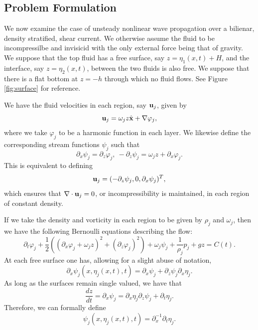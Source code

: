 \documentclass[a4paper,11pt]{article}
\newcommand{\p}{\partial}
\begin{document}
\subsection{Problem Formulation}

We now examine the case of unsteady nonlinear wave propagation over a bilienar, density stratified, shear current.  We otherwise assume the fluid to be incompressilbe and invisicid with the only external force being that of gravity.  We suppose that the top fluid has a free surface, say $z=\eta_{1}(x,t)+H$, and the interface, say $z=\eta_{2}(x,t)$, between the two fluids is also free.  We suppose that there is a flat bottom at $z=-h$ through which no fluid flows.  See Figure \ref{fig:surface} for reference. 

We have the fluid velocities in each region, say ${\bf u}_{j}$, given by 
\[
{\bf u}_{j} = \omega_{j}z\hat{{\bf x}} + \nabla \varphi_{j}, 
\]
where we take $\varphi_{j}$ to be a harmonic function in each layer.  We likewise define the corresponding stream functions $\psi_{j}$ such that 
\[
\p_{x}\psi_{j} = \p_{z}\varphi_{j}, ~ -\p_{z}\psi_{j} = \omega_{j}z + \p_{x}\varphi_{j}.
\]
This is equivalent to defining 
\[
{\bf u}_{j} = (-\p_{z}\psi_{j},0,\p_{x}\psi_{j})^{T}, 
\]
which ensures that $\nabla \cdot {\bf u}_{j} = 0$, or incompressibility is maintained, in each region of constant density.  

If we take the density and vorticity in each region to be given by $\rho_{j}$ and $\omega_{j}$, then we have the following Bernoulli equations describing the flow:
\[
\p_{t}\varphi_{j} + \frac{1}{2} \left( (\p_{x}\varphi_{j}+\omega_{j}z)^{2} + (\p_{z}\varphi_{j})^{2} \right) + \omega_{j}\psi_{j} +  \frac{1}{\rho_{j}} p_{j} + gz =C(t).
\]
At each free surface one has, allowing for a slight abuse of notation, 
\[
\p_{x} \psi_{j}(x,\eta_{j}(x,t),t) = \p_{x}\psi_{j} + \p_{z}\psi_{j}\p_{x}\eta_{j}.
\]
As long as the surfaces remain single valued, we have that 
\[
\frac{dz}{dt} = \p_{x}\psi_{j} = \p_{x}\eta_{j}\p_{z}\psi_{j} + \p_{t}\eta_{j}.
\]
Therefore, we can formally define 
\[
\psi_{j}(x,\eta_{j}(x,t),t) = \p_{x}^{-1}\p_{t}\eta_{j}.
\]
\end{document}

